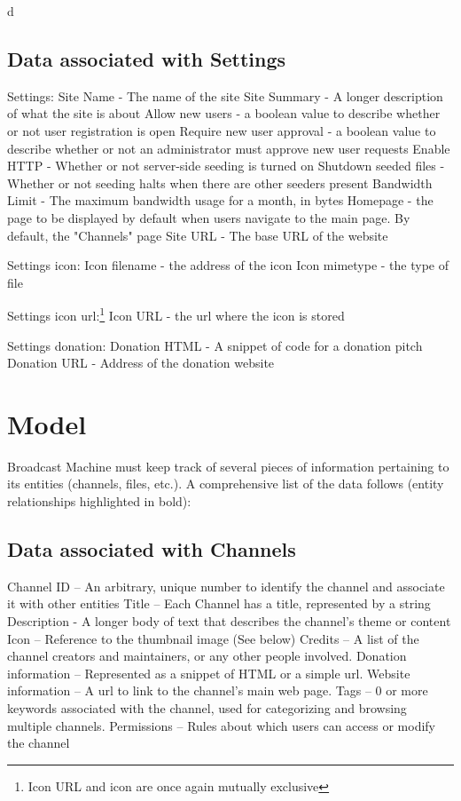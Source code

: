 d\documentclass[a4paper,12pt]{report}
\begin{document}
\subsection{Data associated with Settings}
Settings:
	Site Name - The name of the site
	Site Summary - A longer description of what the site is about
	Allow new users - a boolean value to describe whether or not user registration is open
	Require new user approval - a boolean value to describe whether or not an administrator must approve new user requests
	Enable HTTP - Whether or not server-side seeding is turned on
	Shutdown seeded files - Whether or not seeding halts when there are other seeders present
	Bandwidth Limit - The maximum bandwidth usage for a month, in bytes
	Homepage - the page to be displayed by default when users navigate to the main page. By default, the "Channels" page
	Site URL - The base URL of the website

Settings icon:
	Icon filename - the address of the icon
	Icon mimetype - the type of file
	
Settings icon url:\footnote{Icon URL and icon are once again mutually exclusive}
	Icon URL - the url where the icon is stored

Settings donation:
	Donation HTML - A snippet of code for a donation pitch
	Donation URL - Address of the donation website

\section{Model}
Broadcast Machine must keep track of  several pieces of information pertaining to its entities (channels, files, etc.). 
A comprehensive list of the data follows (entity relationships highlighted in bold):

\subsection{Data associated with Channels}
Channel ID – An arbitrary, unique number to identify the channel and  associate it with other entities
Title – Each Channel has a title, represented by a string
Description - A longer body of text that describes the channel's theme or content
Icon – Reference to the thumbnail image (See below)
Credits – A list of the channel creators and maintainers, or any other people involved. 
Donation information – Represented as a snippet of HTML or a simple url.
Website information – A url to link to the channel's main web page.
Tags – 0 or more keywords associated with the channel, used for categorizing and browsing multiple channels.
Permissions – Rules about which users can access or modify the channel
\end{document}
